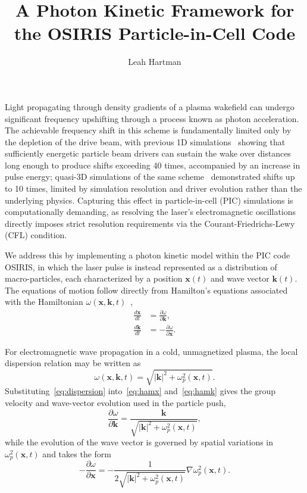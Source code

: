 \documentclass{article}
\title{A Photon Kinetic Framework for the OSIRIS Particle-in-Cell Code}
\author{Leah Hartman}
\begin{document}
\maketitle

Light propagating through density gradients of a plasma wakefield can undergo
significant frequency upshifting through a process known as photon acceleration.
The achievable frequency shift in this scheme is fundamentally limited only by
the depletion of the drive beam, with previous 1D simulations~\cite{sandberg2023prl} showing that
sufficiently energetic particle beam drivers can sustain the wake over distances
long enough to produce shifts exceeding 40 times, accompanied by an increase in 
pulse energy; quasi-3D simulations of the same scheme~\cite{sandberg2024pre} demonstrated shifts up
to 10 times, limited by simulation resolution and driver evolution rather than
the underlying physics. Capturing this effect in particle-in-cell (PIC) 
simulations is computationally demanding, as resolving the laser's electromagnetic
oscillations directly imposes strict resolution requirements via the 
Courant-Friedrichs-Lewy (CFL) condition.

We address this by implementing a photon kinetic model within the PIC code OSIRIS, 
in which the laser pulse is instead represented as a distribution of macro-particles,
each characterized by a position $\mathbf{x}(t)$ and wave vector $\mathbf{k}(t)$. The 
equations of motion follow directly from Hamilton's equations associated with the
Hamiltonian $\omega(\mathbf{x},\mathbf{k}, t)$~\cite{mendonca2001},
\begin{subequations}
\label{eq:hamilton}
\begin{align}
    \frac{d\mathbf{x}}{dt} &= \frac{\partial \omega}{\partial \mathbf{k}}, \label{eq:hamx}\\
    \frac{d\mathbf{k}}{dt} &= -\frac{\partial \omega}{\partial \mathbf{x}}. \label{eq:hamk}
\end{align}
\end{subequations}

For electromagnetic wave propagation in a cold, unmagnetized plasma, the local
dispersion relation may be written as
\begin{equation}
    \omega(\mathbf{x},\mathbf{k}, t) = \sqrt{|\mathbf{k}|^2 + \omega_p^2(\mathbf{x},t)}.
    \label{eq:dispersion}
\end{equation}
Substituting~\eqref{eq:dispersion} into~\eqref{eq:hamx} and~\eqref{eq:hamk} gives the
group velocity and wave-vector evolution used in the particle push,
\begin{equation}
    \frac{\partial \omega}{\partial \mathbf{k}} = \frac{\mathbf{k}}{\sqrt{|\mathbf{k}|^2 + \omega_p^2(\mathbf{x}, t)}},
\end{equation}
while the evolution of the wave vector is governed by spatial variations in
$\omega_p^2(\mathbf{x},t)$ and takes the form
\begin{equation}
    -\frac{\partial \omega}{\partial \mathbf{x}}
    =
    -\frac{1}{2\sqrt{|\mathbf{k}|^2 + \omega_p^2(\mathbf{x},t)}} \nabla \omega_p^2(\mathbf{x},t).
\end{equation}
\end{document}
